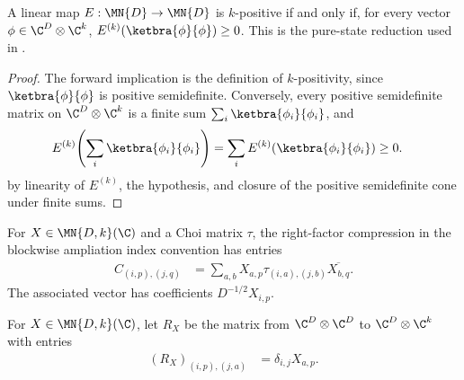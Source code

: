 \begin{theorem}\label{thm:k_positive_rank_one_test}
    \leanok
    A linear map $E:\MN{D}\to\MN{D}$ is $k$-positive if and only if, for
    every vector $\phi\in\C^D\otimes\C^k$,
    $E^{(k)}(\ketbra{\phi}{\phi})\ge0$.
    This is the pure-state reduction used in
    \cite[Chapter~3, Proposition~3.1]{Wolf2012Quantum}.
\end{theorem}

\begin{proof}
    \leanok
    The forward implication is the definition of $k$-positivity, since
    $\ketbra{\phi}{\phi}$ is positive semidefinite. Conversely, every
    positive semidefinite matrix on $\C^D\otimes\C^k$ is a finite sum
    $\sum_i\ketbra{\phi_i}{\phi_i}$, and
    \begin{align}
        E^{(k)}\!\left(\sum_i\ketbra{\phi_i}{\phi_i}\right)
         & =\sum_iE^{(k)}(\ketbra{\phi_i}{\phi_i})\ge0.
        \notag
    \end{align}
    by linearity of $E^{(k)}$, the hypothesis, and closure of the positive
    semidefinite cone under finite sums.
\end{proof}

\begin{definition}\label{def:choi_right_compression}
    \leanok
    For $X\in\MN{D,k}(\C)$ and a Choi matrix $\tau$, the right-factor
    compression in the blockwise ampliation index convention has entries
    \begin{align}
        C_{(i,p),(j,q)}
         & =\sum_{a,b}X_{a,p}\tau_{(i,a),(j,b)}
        \overline{X_{b,q}}.
        \label{eq:schwarz_right_choi_compression}
    \end{align}
    The associated vector has coefficients $D^{-1/2}X_{i,p}$.
\end{definition}

\begin{definition}
    \label{def:choi_right_tensor_factor}
    \leanok
    For $X\in\MN{D,k}(\C)$, let $R_X$ be the matrix from
    $\C^D\otimes\C^D$ to $\C^D\otimes\C^k$ with entries
    \begin{align}
        (R_X)_{(i,p),(j,a)}
         & =\delta_{i,j}X_{a,p}.
        \label{eq:schwarz_right_tensor_factor}
    \end{align}
\end{definition}

